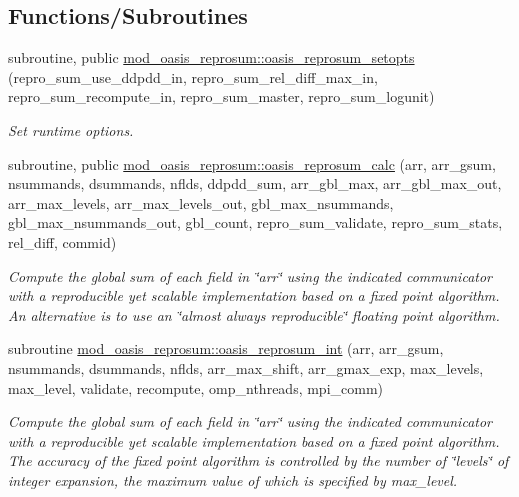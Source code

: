 \subsection*{Functions/\+Subroutines}
\begin{DoxyCompactItemize}
\item 
subroutine, public \hyperlink{namespacemod__oasis__reprosum_ad6b4914497a4961339a1c95bfb807660}{mod\+\_\+oasis\+\_\+reprosum\+::oasis\+\_\+reprosum\+\_\+setopts} (repro\+\_\+sum\+\_\+use\+\_\+ddpdd\+\_\+in, repro\+\_\+sum\+\_\+rel\+\_\+diff\+\_\+max\+\_\+in, repro\+\_\+sum\+\_\+recompute\+\_\+in, repro\+\_\+sum\+\_\+master, repro\+\_\+sum\+\_\+logunit)
\begin{DoxyCompactList}\small\item\em Set runtime options. \end{DoxyCompactList}\item 
subroutine, public \hyperlink{namespacemod__oasis__reprosum_a398280c78cff126b7622dbd96af675e4}{mod\+\_\+oasis\+\_\+reprosum\+::oasis\+\_\+reprosum\+\_\+calc} (arr, arr\+\_\+gsum, nsummands, dsummands, nflds, ddpdd\+\_\+sum, arr\+\_\+gbl\+\_\+max, arr\+\_\+gbl\+\_\+max\+\_\+out, arr\+\_\+max\+\_\+levels, arr\+\_\+max\+\_\+levels\+\_\+out, gbl\+\_\+max\+\_\+nsummands, gbl\+\_\+max\+\_\+nsummands\+\_\+out, gbl\+\_\+count, repro\+\_\+sum\+\_\+validate, repro\+\_\+sum\+\_\+stats, rel\+\_\+diff, commid)
\begin{DoxyCompactList}\small\item\em Compute the global sum of each field in \char`\"{}arr\char`\"{} using the indicated communicator with a reproducible yet scalable implementation based on a fixed point algorithm. An alternative is to use an \char`\"{}almost
 always reproducible\char`\"{} floating point algorithm. \end{DoxyCompactList}\item 
subroutine \hyperlink{namespacemod__oasis__reprosum_a7ea3c5bad9db10c80eb528453602aed3}{mod\+\_\+oasis\+\_\+reprosum\+::oasis\+\_\+reprosum\+\_\+int} (arr, arr\+\_\+gsum, nsummands, dsummands, nflds, arr\+\_\+max\+\_\+shift, arr\+\_\+gmax\+\_\+exp, max\+\_\+levels, max\+\_\+level, validate, recompute, omp\+\_\+nthreads, mpi\+\_\+comm)
\begin{DoxyCompactList}\small\item\em Compute the global sum of each field in \char`\"{}arr\char`\"{} using the indicated communicator with a reproducible yet scalable implementation based on a fixed point algorithm. The accuracy of the fixed point algorithm is controlled by the number of \char`\"{}levels\char`\"{} of integer expansion, the maximum value of which is specified by max\+\_\+level. \end{DoxyCompactList}\item 

\end{DoxyCompactItemize}
